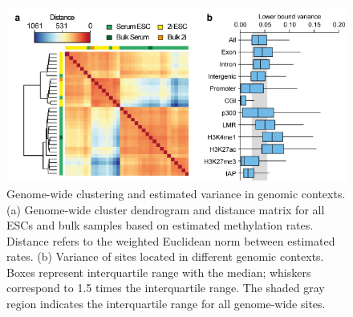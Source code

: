 \begin{figure}[htbp!]
\centering
\includegraphics[width=1.0\textwidth]{clust}
\caption[Genome-wide clustering and estimated variance in genomic contexts.]{Genome-wide clustering and estimated variance in genomic contexts. (a) Genome-wide cluster dendrogram and distance matrix for all ESCs and bulk samples based on estimated methylation rates. Distance refers to the weighted Euclidean norm between estimated rates. (b) Variance of sites located in different genomic contexts. Boxes represent interquartile range with the median; whiskers correspond to 1.5 times the interquartile range. The shaded gray region indicates the interquartile range for all genome-wide sites.}
\label{fig:bs_clust}
\end{figure}
